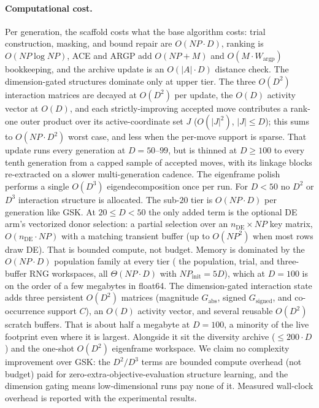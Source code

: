 \documentclass[10pt,a4paper]{article}
\begin{document}
\paragraph{Computational cost.}
Per generation, the scaffold costs what the base algorithm costs:
trial construction, masking, and bound repair are $O(NP\cdot D)$,
ranking is $O(NP\log NP)$, ACE and ARGP add $O(NP+M)$ and
$O(M\cdot W_{\text{argp}})$ bookkeeping, and the archive update is an
$O(|A|\cdot D)$ distance check. 
The dimension-gated structures dominate only at upper tier. The three
$O(D^{2})$ interaction matrices are decayed at $O(D^{2})$ per update, the
$O(D)$ activity vector at $O(D)$, and each
strictly-improving accepted move contributes a rank-one outer product over
its active-coordinate set $J$ ($O(|J|^{2})$, $|J|\le D$); this sums to
$O(NP\cdot D^{2})$ worst case, and less when the per-move support is sparse.
That update runs every generation at $D=50$--$99$, but is thinned at $D\ge100$
to every tenth generation from a capped sample of accepted moves, with its
linkage blocks re-extracted on a slower multi-generation cadence. The
eigenframe polish performs a single $O(D^{3})$ eigendecomposition once per
run. 
For $D<50$ no $D^{2}$ or $D^{3}$ interaction structure is allocated. The
sub-$20$ tier is $O(NP\cdot D)$ per generation like GSK. At $20\le D<50$ the
only added term is the optional DE arm's vectorized donor selection: a partial
selection over an $n_{\mathrm{DE}}\times NP$ key matrix, $O(n_{\mathrm{DE}}\cdot NP)$
with a matching transient buffer (up to $O(NP^{2})$ when most rows draw DE).
That is bounded compute, not budget. 
Memory is dominated by the $O(NP\cdot D)$ population family at every tier (
the population, trial, and three-buffer RNG workspaces, all $\Theta(NP\cdot D)$
with $NP_{\text{init}}=5D$), which at $D=100$ is on the order of a few
megabytes in float64.  The dimension-gated interaction state adds three
persistent $O(D^{2})$ matrices (magnitude $G_{\mathrm{abs}}$, signed
$G_{\mathrm{signed}}$, and co-occurrence support $C$), an $O(D)$ activity vector,
and several reusable $O(D^{2})$ scratch buffers. That is about half a megabyte at
$D=100$, a minority of the live footprint even where it is largest. Alongside
it sit the diversity archive ($\le 200\cdot D$) and the one-shot $O(D^{2})$
eigenframe workspace. 
We claim no complexity improvement over GSK: the $D^{2}/D^{3}$ terms
are bounded compute overhead (not budget) paid for
zero-extra-objective-evaluation structure learning, and the
dimension gating means low-dimensional runs pay none of it.
Measured wall-clock overhead is reported with the experimental
results.
\end{document}
